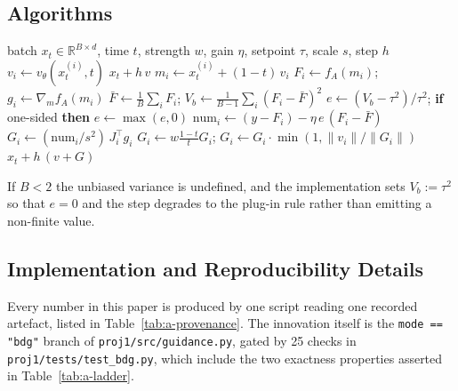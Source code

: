 \documentclass{article}
\newcommand{\Fbar}{\bar{F}}
\newcommand{\weff}{w_{\mathrm{eff}}}
\newcommand{\Vb}{V_{b}}
\begin{document}
\subsection{Algorithms}
\begin{algorithm}[H]
\caption{One guided sampling step with Batch-Dispersion Guidance. Nothing is trained
at sampling time; the generator $v_\theta$ and guide $f_A$ are frozen.
Modality-specific inputs are the endpoint map and the property $f_A$.}
\label{alg:bdg}
\begin{algorithmic}[1]
\Require batch $x_t\in\mathbb{R}^{B\times d}$, time $t$, strength $w$, gain $\eta$,
  setpoint $\tau$, scale $s$, step $h$
\State $v_i \gets v_\theta(x_t^{(i)},t)$ 
 \Return $x_t + h\,v$ 
\EndIf
\State $m_i \gets x_t^{(i)} + (1-t)\,v_i$ 
\State $F_i \gets f_A(m_i)$; \quad $g_i \gets \nabla_m f_A(m_i)$ 
\State $\Fbar \gets \tfrac{1}{B}\sum_i F_i$; \quad
       $\Vb \gets \tfrac{1}{B-1}\sum_i (F_i-\Fbar)^2$ 
\State $e \gets (\Vb-\tau^2)/\tau^2$; \quad \textbf{if} one-sided \textbf{then} $e \gets \max(e,0)$
\State $\mathrm{num}_i \gets (y-F_i) - \eta\,e\,(F_i-\Fbar)$
       \Comment{$=(y-\Fbar)-\weff(F_i-\Fbar)$, $\weff=1+\eta e$}
\State $G_i \gets (\mathrm{num}_i/s^2)\,J_i^{\!\top} g_i$ 
\State $G_i \gets w\tfrac{1-t}{t}G_i$; \quad
       $G_i \gets G_i\cdot\min(1,\|v_i\|/\|G_i\|)$ 
\State \Return $x_t + h\,(v + G)$
\end{algorithmic}
\end{algorithm}
If $B<2$ the unbiased variance is undefined, and the implementation sets
$\Vb:=\tau^2$ so that $e=0$ and the step degrades to the plug-in rule rather than
emitting a non-finite value.

\subsection{Implementation and Reproducibility Details}
Every number in this paper is produced by one script reading one recorded
artefact, listed in Table~\ref{tab:a-provenance}. The innovation itself is the
\texttt{mode == "bdg"} branch of \texttt{proj1/src/guidance.py}, gated by 25 checks
in \texttt{proj1/tests/test\_bdg.py}, which include the two exactness properties
asserted in Table~\ref{tab:a-ladder}.
\end{document}
